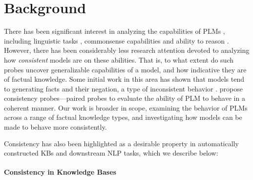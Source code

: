 







\section{Background}
\label{sec:background}

There has been significant interest in analyzing the capabilities of PLMs \cite{rogers2020primer}, including linguistic tasks \cite{yoav-syntax,hewitt2019structural,tenney2019bert,amnesic_probing}, commonsense capabilities \cite{forbes2019neural, da2019cracking,zhang2020language} and ability to reason \cite{talmor2019olmpics, kassner-etal-2020-pretrained}. However, there has been considerably less research attention devoted to analyzing how \emph{consistent} models are on these abilities. That is, to what extent do such probes uncover generalizable capabilities of a model, and how indicative they are of 
factual knowledge. 
Some initial work in this area has shown that models tend to generating facts and their negation, a type of inconsistent behavior \cite{Ettinger_2020,kassner-schutze-2020-negated}.  propose consistency probes---paired probes to evaluate the ability of PLM to behave in a coherent manner. Our work is broader in scope, examining the behavior of PLMs across a range of factual knowledge types, and investigating how models can be made to behave more consistently. 

Consistency has also been highlighted as a desirable property in automatically constructed KBs and downstream NLP tasks, which we describe below:

\paragraph{Consistency in Knowledge Bases}

